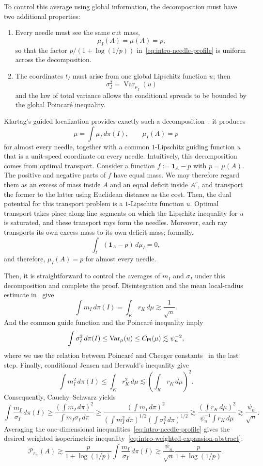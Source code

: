 \documentclass[11pt]{article}
\theoremstyle{definition}
\theoremstyle{remark}
\newcommand{\cP}{\mathcal P}
\newcommand{\one}{\mathbf 1}
\newcommand{\rK}{r_K}
\begin{document}
To control this average using global information, the decomposition must have two additional properties:
\begin{enumerate}
    \item Every needle must see the same cut mass,
    \[
     \mu_I(A)=\mu(A)=p,
    \]
    so that the factor $p/(1+\log(1/p))$ in~\eqref{eq:intro-needle-profile} is uniform across the decomposition.
    \item The coordinates $t_I$ must arise from one global Lipschitz function $u$; then
    \[
     \sigma_I^2=\operatorname{Var}_{\mu_I}(u)
    \]
    and the law of total variance allows the conditional spreads to be bounded by the global Poincar\'e inequality.
\end{enumerate}
Klartag's guided localization provides exactly such a decomposition~\cite{KlartagNeedles}: it produces
\[
 \mu=\int\mu_I\,d\pi(I),
 \qquad
 \mu_I(A)=p
\]
for almost every needle, together with a common $1$-Lipschitz guiding function $u$ that is a unit-speed coordinate on every needle. Intuitively, this decomposition comes from optimal transport. Consider a function $f:=\one_A-p$ with $p=\mu(A)$. The positive and negative parts of $f$ have equal mass.  We may therefore regard them as an excess of mass inside $A$ and an equal deficit inside $A^c$, and transport the former to the latter using Euclidean distance as the cost. Then, the dual potential for this transport problem is a $1$-Lipschitz function $u$.  Optimal transport takes place along line segments on which the Lipschitz inequality for $u$ is saturated, and these transport rays form the needles. Moreover, each ray transports its own excess mass to its own deficit mass; formally,
\[
 \int_I(\one_A-p)\,d\mu_I=0, 
\]
and therefore, $\mu_I(A)=p$ for almost every needle.

Then, it is straightforward to control the averages of $m_I$ and $\sigma_I$ under this decomposition and complete the proof.  Disintegration and the mean local-radius estimate in~\cite{LV} give
\[
 \int m_I\,d\pi(I)  =  \int_K r_K\,d\mu  \gtrsim  \frac1{\sqrt n}.
\]
And the common guide function and the Poincar\'e inequality imply
\[
 \int\sigma_I^2\,d\pi(I)  \le  \operatorname{Var}_\mu(u)  \le  C_{\sf PI}(\mu)\lesssim \psi_n^{-2},
\]
where we use the relation between Poincar\'e and Cheeger constants~\cite{Cheeger,buser1982note,ledoux2004spectral,KLS95} in the last step.
Finally, conditional Jensen and Berwald's inequality
\cite{Berwald,LangharstPutterman} give
\[
 \int m_I^2\,d\pi(I)
 \le
 \int_K r_K^2\,d\mu
 \lesssim
 \left(\int_K r_K\,d\mu\right)^2.
\]
Consequently, Cauchy--Schwarz yields
\[
 \int\frac{m_I}{\sigma_I}\,d\pi(I)\ge
 \frac{\left(\int m_I\,d\pi\right)^2}
      {\int m_I\sigma_I\,d\pi}\ge
 \frac{\left(\int m_I\,d\pi\right)^2}
      {\left(\int m_I^2\,d\pi\right)^{1/2}
       \left(\int\sigma_I^2\,d\pi\right)^{1/2}}
 \gtrsim
 \frac{(\int \rK\,d\mu)^2}
      {\psi_n^{-1}\int \rK\,d\mu}
 \gtrsim
 \frac{\psi_n}{\sqrt n}.
\]
Averaging the one-dimensional inequalities~\eqref{eq:intro-needle-profile} gives the desired weighted isoperimetric inequality~\eqref{eq:intro-weighted-expansion-abstract}:
\[
 \cP_{r_K}(A)
 \gtrsim\frac{p}{1+\log(1/p)}
 \int\frac{m_I}{\sigma_I}\,d\pi(I) \gtrsim 
 \frac{\psi_n}{\sqrt n}
 \frac{p}{1+\log(1/p)}.
\]
\end{document}
